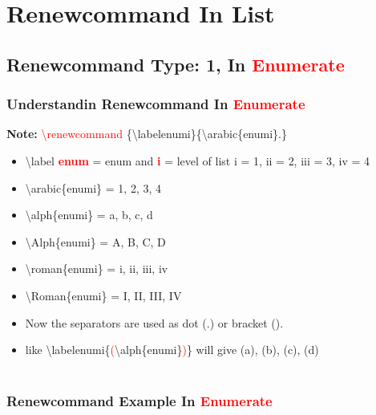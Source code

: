 \documentclass[a4paper, 10pt]{book}
\begin{document}
\chapter[ Renewcommand In List]{Renewcommand In List}
\section{Renewcommand Type: 1, In \textcolor{red}{Enumerate}}

\subsection{Understandin Renewcommand In \textcolor{red}{Enumerate}}
\textbf{Note:} \textcolor{red}{\textbackslash renewcommand}
\{\textbackslash labelenumi\}\{\textbackslash arabic\{enumi\}.\}
\begin{itemize}
	\item \textbackslash label \textcolor{red}{\textbf{enum}} = enum and \textcolor{red}{\textbf{i}} = level of list i = 1, ii = 2, iii = 3, iv = 4
	\item \textbackslash arabic\{enumi\} = 1, 2, 3, 4
	\item \textbackslash alph\{enumi\} = a, b, c, d
	\item \textbackslash Alph\{enumi\} = A, B, C, D
	\item \textbackslash roman\{enumi\} = i, ii, iii, iv
	\item \textbackslash Roman\{enumi\} = I, II, III, IV
	\item Now the separators are used as dot (.) or bracket ().
	\item like \textbackslash labelenumi\{\textcolor{red}{(}\textbackslash alph\{enumi\}\textcolor{red}{)}\} will give (a), (b), (c), (d) \\\\
\end{itemize}


\subsection{Renewcommand Example In \textcolor{red}{Enumerate}}
\renewcommand{\labelenumi}{\Roman{enumi}.}
\renewcommand{\labelenumii}{\Roman{enumi}.(\arabic{enumii})}
\renewcommand{\labelenumiii}{\Roman{enumi}.(\arabic{enumii})\arabic{enumiii}}
\renewcommand{\labelenumiv}{\Roman{enumi}.(\arabic{enumii})\arabic{enumiii}.(\arabic{enumiv})}
\end{document}
